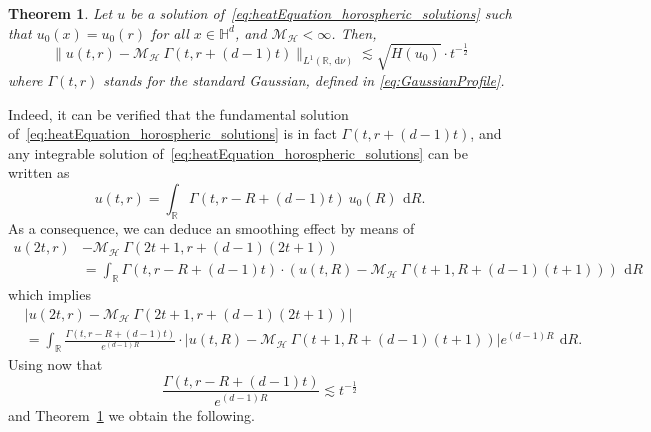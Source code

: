 \documentclass[12pt,longbibliography]{article}
\newcommand{\abs}[1]{\left\vert#1\right\vert}
\def\R{\mathbb{R}}
\def\d{\,\mathrm{d}}
\def\R{\mathbb{R}}
\def\d{\,\mathrm{d}}
\def\H{\mathbb{H}}
\newtheorem{thm}{Theorem}[section]
\theoremstyle{definition}
\theoremstyle{remark}
\theoremstyle{example}
\begin{document}
\begin{thm}\label{thm:convregece_horoshepric_L^1}
	Let $u$ be a solution of~\eqref{eq:heatEquation_horospheric_solutions} such that $u_0(x)=u_0(r)$ for all $x\in\H^d$, and $\mathcal{M}_{\mathcal{H}}<\infty$. Then,
	\[
	\|u(t,r)- \mathcal{M}_{\mathcal{H}}\ \Gamma(t, r+(d-1)t) \|_{L^1(\R, \d\nu)} \lesssim \sqrt{H(u_0)} \cdot t^{-\frac{1}{2}}
	\]
	where $\Gamma(t,r)$ stands for the standard Gaussian, defined in \eqref{eq:GaussianProfile}.
\end{thm}

Indeed, it can be verified that the fundamental solution of~\eqref{eq:heatEquation_horospheric_solutions} is in fact $\Gamma(t, r+(d-1)t)$, and any integrable solution of~\eqref{eq:heatEquation_horospheric_solutions} can be written as
\[
u(t, r)=\int_\R \Gamma(t, r-R+(d-1)t)\ u_0(R)\ \d R.
\]
As a consequence, we can deduce an smoothing effect by means of
\[
\begin{aligned}
	u(2t, r)&- \mathcal{M}_{\mathcal{H}}\ \Gamma(2t+1, r+(d-1)(2t+1))\\[10pt]
	&= \int_\R \Gamma(t, r-R+(d-1)t)\cdot \left(u(t, R)- \mathcal{M}_{\mathcal{H}}\ \Gamma(t+1, R+(d-1)(t+1))\right)\ \d R
\end{aligned}
\]
which implies
\[
\begin{aligned}
	&|u(2t, r)- \mathcal{M}_{\mathcal{H}}\ \Gamma(2t+1, r+(d-1)(2t+1))|\\[10pt]
	&= \int_\R \frac{\Gamma(t, r-R+(d-1)t)}{e^{(d-1)R}}\cdot |u(t, R)- \mathcal{M}_{\mathcal{H}}\ \Gamma(t+1, R+(d-1)(t+1))| e^{(d-1)R}\ \d R.
\end{aligned}
\]
Using now that
\[
\frac{\Gamma(t, r-R+(d-1)t)}{e^{(d-1)R}}\lesssim t^{-\frac{1}{2}}
\]
and Theorem~\ref{thm:convregece_horoshepric_L^1} we obtain the following.
\end{document}

